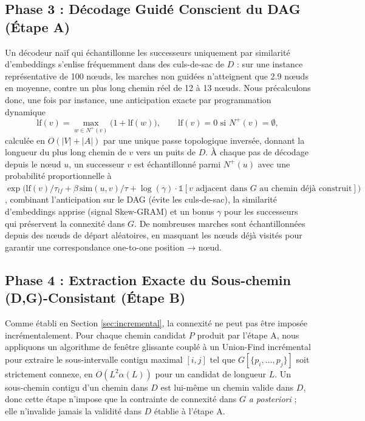 \documentclass{llncs}
\begin{document}
\subsection{Phase 3 : Décodage Guidé Conscient du DAG (Étape A)}
Un décodeur naïf qui échantillonne les successeurs uniquement par similarité d'embeddings s'enlise fréquemment dans des culs-de-sac de $D$ : sur une instance représentative de 100 nœuds, les marches non guidées n'atteignent que 2.9 nœuds en moyenne, contre un plus long chemin réel de 12 à 13 nœuds. Nous précalculons donc, une fois par instance, une anticipation exacte par programmation dynamique
\begin{equation}
\mathrm{lf}(v) = \max_{w \in N^+(v)} \big(1 + \mathrm{lf}(w)\big), \qquad \mathrm{lf}(v)=0 \text{ si } N^+(v)=\emptyset,
\end{equation}
calculée en $O(|V|+|A|)$ par une unique passe topologique inversée, donnant la longueur du plus long chemin de $v$ vers un puits de $D$. À chaque pas de décodage depuis le nœud $u$, un successeur $v$ est échantillonné parmi $N^+(u)$ avec une probabilité proportionnelle à $\exp\!\big(\mathrm{lf}(v)/\tau_{lf} + \beta\,\mathrm{sim}(u,v)/\tau + \log(\gamma)\cdot\mathbb{1}[v \text{ adjacent dans } G \text{ au chemin déjà construit}]\big)$, combinant l'anticipation sur le DAG (évite les culs-de-sac), la similarité d'embeddings apprise (signal Skew-GRAM) et un bonus $\gamma$ pour les successeurs qui préservent la connexité dans $G$. De nombreuses marches sont échantillonnées depuis des nœuds de départ aléatoires, en masquant les nœuds déjà visités pour garantir une correspondance one-to-one position → nœud.

\subsection{Phase 4 : Extraction Exacte du Sous-chemin (D,G)-Consistant (Étape B)}
Comme établi en Section \ref{sec:incremental}, la connexité ne peut pas être imposée incrémentalement. Pour chaque chemin candidat $P$ produit par l'étape A, nous appliquons un algorithme de fenêtre glissante couplé à un Union-Find incrémental pour extraire le sous-intervalle contigu maximal $[i,j]$ tel que $G[\{p_i,\dots,p_j\}]$ soit strictement connexe, en $O(L^2\alpha(L))$ pour un candidat de longueur $L$. Un sous-chemin contigu d'un chemin dans $D$ est lui-même un chemin valide dans $D$, donc cette étape n'impose que la contrainte de connexité dans $G$ \emph{a posteriori} ; elle n'invalide jamais la validité dans $D$ établie à l'étape A.
\end{document}
